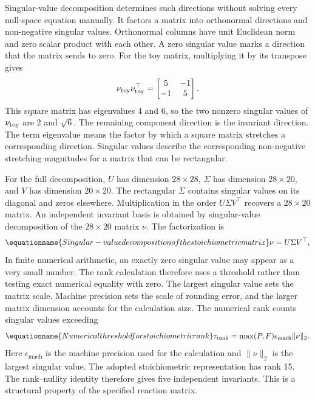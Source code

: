 Singular-value decomposition determines such directions without solving every null-space equation manually. It factors a matrix into orthonormal directions and non-negative singular values. Orthonormal columns have unit Euclidean norm and zero scalar product with each other. A zero singular value marks a direction that the matrix sends to zero. For the toy matrix, multiplying it by its transpose gives
\[
\nu_{\rm toy}\nu_{\rm toy}^\top
=\begin{bmatrix}5&-1\\-1&5\end{bmatrix}.
\]
This square matrix has eigenvalues 4 and 6, so the two nonzero singular values of $\nu_{\rm toy}$ are 2 and $\sqrt6$. The remaining component direction is the invariant direction. The term eigenvalue means the factor by which a square matrix stretches a corresponding direction. Singular values describe the corresponding non-negative stretching magnitudes for a matrix that can be rectangular.

For the full decomposition, $U$ has dimension $28\times28$, $\Sigma$ has dimension $28\times20$, and $V$ has dimension $20\times20$. The rectangular $\Sigma$ contains singular values on its diagonal and zeros elsewhere. Multiplication in the order $U\Sigma V^\top$ recovers a $28\times20$ matrix. An independent invariant basis is obtained by singular-value decomposition of the $28\times20$ matrix $\nu$. The factorization is
\begin{equation}
\equationname{Singular-value decomposition of the stoichiometric matrix}
\nu=U\Sigma V^\top,
\label{eq:stoichiometric_svd}
\end{equation}
In finite numerical arithmetic, an exactly zero singular value may appear as a very small number. The rank calculation therefore uses a threshold rather than testing exact numerical equality with zero. The largest singular value sets the matrix scale. Machine precision sets the scale of rounding error, and the larger matrix dimension accounts for the calculation size. The numerical rank counts singular values exceeding
\begin{equation}
\equationname{Numerical threshold for stoichiometric rank}
\tau_{\mathrm{rank}}=\max(P,F)\epsilon_{\mathrm{mach}}\|\nu\|_2.
\label{eq:stoichiometric_rank_threshold}
\end{equation}
Here $\epsilon_{\mathrm{mach}}$ is the machine precision used for the calculation and $\|\nu\|_2$ is the largest singular value. The adopted stoichiometric representation has rank 15. The rank--nullity identity therefore gives five independent invariants. This is a structural property of the specified reaction matrix.

